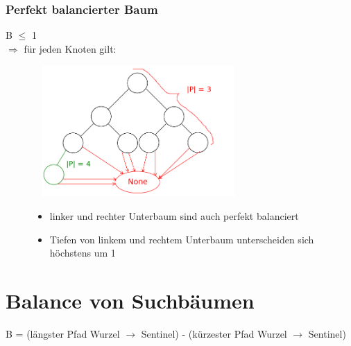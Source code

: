 \subsubsection{Perfekt balancierter Baum}
B $\leq$ 1 \\
$\Rightarrow$ für jeden Knoten gilt:
\begin{figure}[htbp]
    \begin{minipage}[t]{8cm}
        \vspace{0pt}
        \centering
        \includegraphics[width=8cm,height=5cm,keepaspectratio]{./Pictures/perfektbalanBaum.png}
    \end{minipage}
    \begin{minipage}[t]{6cm}
        \vspace{1cm}
        \begin{itemize}
            \item linker und rechter Unterbaum sind auch perfekt balanciert
            \item Tiefen von linkem und rechtem Unterbaum unterscheiden sich höchstens um 1
        \end{itemize}
    \end{minipage}
\end{figure}

\section{Balance von Suchbäumen}
B = (längster Pfad Wurzel $\rightarrow$ Sentinel) - (kürzester Pfad Wurzel $\rightarrow$ Sentinel)

